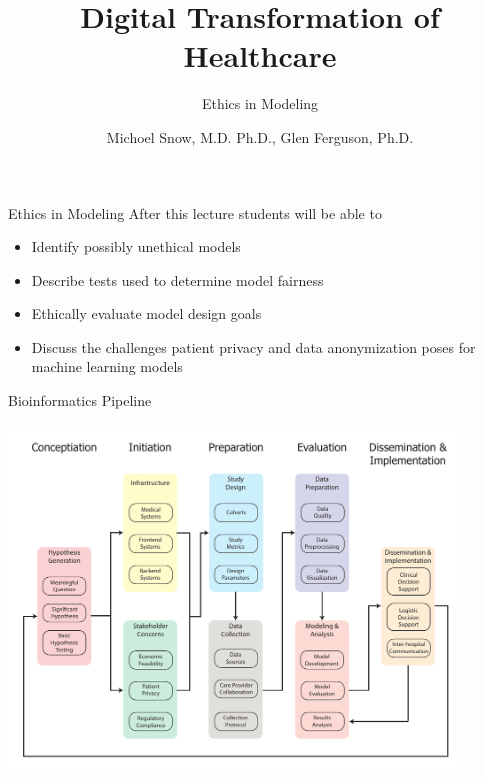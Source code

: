 \documentclass[10pt, xcolor=table]{beamer}
\title{Digital Transformation of Healthcare}
\subtitle{Ethics in Modeling}
\date{}
\author{Michoel Snow, M.D. Ph.D., Glen Ferguson, Ph.D.}
\institute{Center for Health Data Innovations}
\begin{document}
\maketitle


\begin{frame}{Ethics in Modeling}
	After this lecture students will be able to 
	\begin{itemize}
		\item Identify possibly unethical models
		\item Describe tests used to determine model fairness
		\item Ethically evaluate model design goals
		\item Discuss the challenges patient privacy and data anonymization poses for machine learning models
	\end{itemize}
\end{frame}


\begin{frame}{Bioinformatics Pipeline}
	\begin{center}
		\includegraphics[width=0.9\textwidth]{images/informatics_pipeline.pdf}	
	\end{center}
\end{frame}
\end{document}
